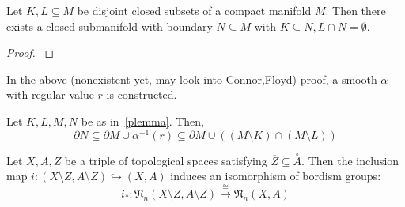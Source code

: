 \documentclass[a4paper,11pt]{article}
\begin{document}
\begin{lemma}\label{plemma}
    Let \(K,L\subseteq M\) be disjoint closed subsets of a compact manifold \(M\). Then there exists a closed submanifold with boundary \(N\subseteq M\) with \(K\subseteq N, L\cap N=\emptyset\).
\end{lemma}

\begin{proof}\cite{zhang}
\end{proof}

In the above (nonexistent yet, may look into Connor,Floyd) proof, a smooth \(\alpha\) with regular value \(r\) is constructed.

\begin{lemma}\label{plemma2}
    Let \(K,L,M,N\) be as in\ \ref{plemma}. Then,
    \[\partial N\subseteq \partial M\cup \alpha^{-1}(r)\subseteq \partial M\cup((M\setminus K)\cap(M\setminus L))\]
\end{lemma}

\begin{lemma}\label{excision}
    Let \(X,A,Z\) be a triple of topological spaces satisfying \(\overline{Z}\subseteq\overset{\circ}{A}\). Then the inclusion map \(i:(X\setminus Z,A\setminus Z)\hookrightarrow(X,A)\) induces an isomorphism of bordism groups:
    \[i_\ast:\mathfrak{N}_n(X\setminus Z,A\setminus Z)\xrightarrow{\cong}\mathfrak{N}_n(X,A)\]
\end{lemma}
\end{document}
